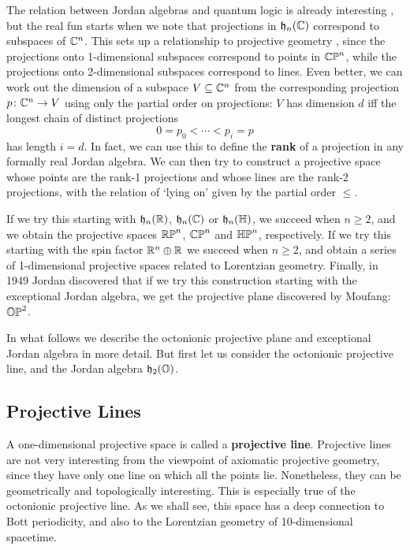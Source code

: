 The relation between Jordan algebras and quantum logic is already 
interesting \cite{Emch}, but the real fun starts when we note 
that projections in ${\mathfrak {h}}_n({\mathbb C})$ correspond to subspaces of ${\mathbb C}^n$.   This 
sets up a relationship to projective geometry \cite{Varadarajan}, since 
the projections onto 1-dimensional subspaces correspond to points in 
${\mathbb {CP}}^n$, while the projections onto 2-dimensional subspaces correspond 
to lines.  Even better, we can work out the dimension of a subspace $V 
\subseteq {\mathbb C}^n$ from the corresponding projection $p \colon {\mathbb C}^n \to V$ 
using only the partial order on projections: $V$ has dimension $d$ iff 
the longest chain of distinct projections  
\[   0 = p_0 < \cdots < p_i = p  \] 
has length $i = d$.  In fact, we can use this to define the {\bf rank} 
of a projection in any formally real Jordan algebra.  We can then try to 
construct a projective space whose points are the rank-1 projections and 
whose lines are the rank-2 projections, with the relation of `lying on' 
given by the partial order $\le$.   
 
If we try this starting with ${\mathfrak {h}}_n({\mathbb R})$, ${\mathfrak {h}}_n({\mathbb C})$ or ${\mathfrak {h}}_n({\mathbb H})$, we 
succeed when $n \ge 2$, and we obtain the projective spaces ${\mathbb {RP}}^n$, 
${\mathbb {CP}}^n$ and ${\mathbb {HP}}^n$, respectively.  If we try this starting with the 
spin factor ${\mathbb R}^n \oplus {\mathbb R}$ we succeed when $n \ge 2$, and obtain a 
series of 1-dimensional projective spaces related to Lorentzian 
geometry.  Finally, in 1949 Jordan \cite{Jordan2} discovered that if we 
try this construction starting with the exceptional Jordan algebra, we 
get the projective plane discovered by Moufang: ${\mathbb {OP}}^2$.  
 
In what follows we describe the octonionic projective plane 
and exceptional Jordan algebra in more detail.  But first let us
consider the octonionic projective line, and the Jordan algebra
${\mathfrak {h}}_2({\mathbb O})$.
 
\subsection{Projective Lines}  \label{OP1} 
 
A one-dimensional projective space is called a {\bf projective line}. 
Projective lines are not very interesting from the viewpoint of 
axiomatic projective geometry, since they have only one line on which 
all the points lie.  Nonetheless, they can be geometrically and 
topologically interesting.  This is especially true of the octonionic 
projective line.  As we shall see, this space has a deep connection to 
Bott periodicity, and also to the Lorentzian geometry of 10-dimensional 
spacetime. 
 
